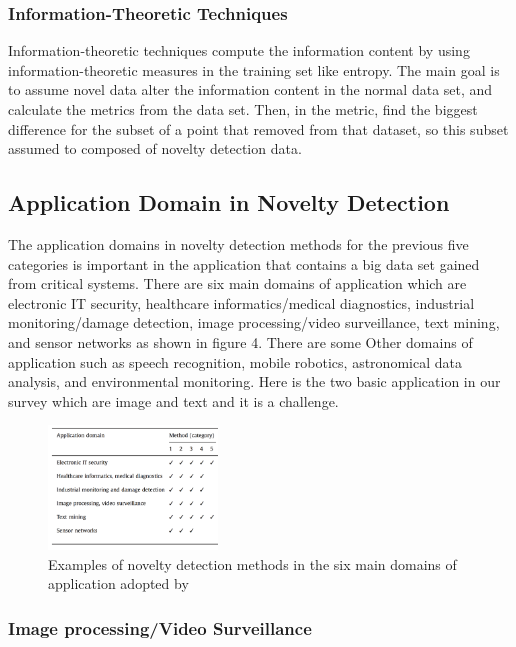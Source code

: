 \documentclass[conference]{IEEEtran}
\begin{document}
\subsubsection{Information-Theoretic Techniques}

Information-theoretic techniques compute the information content by using information-theoretic measures in the training set like entropy. The main goal is to assume novel data alter the information content in the normal data set, and calculate the metrics from the data set. Then, in the metric, find the biggest difference for the subset of a point that removed from that dataset, so this subset assumed to composed of novelty detection data. 

\subsection {Application Domain in Novelty Detection }

The application domains in novelty detection methods for the previous five categories is important in the application that contains a big data set gained from critical systems. There are six main domains of application which are electronic IT security, healthcare informatics/medical diagnostics,  industrial monitoring/damage detection, image processing/video surveillance, text mining, and sensor networks as shown in figure 4. There are some Other domains of application such as speech recognition, mobile robotics, astronomical data analysis, and environmental monitoring. Here is the two basic application in our survey which are image and text and it is a challenge.   

\begin{figure}[h!]
\centering
\includegraphics[width=0.4\textwidth]{22.png}
\caption{\label{}   Examples of novelty detection methods in the six main domains of application adopted by \cite{pimentel2014review} }
\end{figure}




\subsubsection{Image processing/Video Surveillance}
\end{document}
